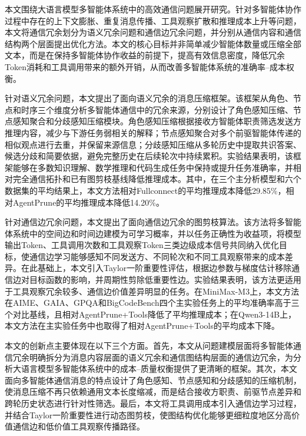 
\begin{conclusion}

本文围绕大语言模型多智能体系统中的高效通信问题展开研究。针对多智能体协作过程中存在的上下文膨胀、重复消息传播、工具观察扩散和推理成本上升等问题，本文将通信冗余划分为语义冗余问题和通信边冗余问题，并分别从通信内容和通信结构两个层面提出优化方法。本文的核心目标并非简单减少智能体数量或压缩全部文本，而是在保持多智能体协作收益的前提下，提高有效信息密度，降低冗余Token消耗和工具调用带来的额外开销，从而改善多智能体系统的准确率--成本权衡。

针对语义冗余问题，本文提出了面向语义冗余的消息压缩框架。该框架从角色、节点和时序三个维度分析多智能体通信中的冗余来源，分别设计了角色感知压缩、节点感知聚合和分歧感知压缩模块。角色感知压缩根据接收方智能体职责筛选发送方推理内容，减少与下游任务弱相关的解释；节点感知聚合对多个前驱智能体传递的相似观点进行去重，并保留来源信息；分歧感知压缩从多轮历史中提取共识答案、候选分歧和简要依据，避免完整历史在后续轮次中持续累积。实验结果表明，该框架能够在多数知识理解、数学推理和代码生成任务中保持或提升任务准确率，并相对完全通信拓扑和已有图剪枝基线降低推理成本。其中，在三个主分析模型和六个数据集的平均结果上，本文方法相对Fullconnect的平均推理成本降低29.85\%，相对AgentPrune的平均推理成本降低14.20\%。

针对通信边冗余问题，本文提出了面向通信边冗余的图剪枝算法。该方法将多智能体系统中的空间边和时间边建模为可学习概率，并以任务正确性为收益项，将模型输出Token、工具调用次数和工具观察Token三类边级成本信号共同纳入优化目标，使通信边学习能够感知不同发送方、不同轮次和不同工具观察带来的成本差异。在此基础上，本文引入Taylor一阶重要性评估，根据边参数与梯度估计移除通信边对目标函数的影响，并周期性剪除低重要性边。实验结果表明，该方法更适用于工具观察冗余较多、通信边价值差异明显的任务。在MiniMax-M3上，本文方法在AIME、GAIA、GPQA和BigCodeBench四个主实验任务上的平均准确率高于三个对比基线，且相对AgentPrune+Tools降低了平均推理成本；在Qwen3-14B上，本文方法在主实验任务中也取得了相对AgentPrune+Tools的平均成本下降。

本文的创新点主要体现在以下三个方面。首先，本文从问题建模层面将多智能体通信冗余明确拆分为消息内容层面的语义冗余和通信图结构层面的通信边冗余，为分析大语言模型多智能体系统中的成本--质量权衡提供了更清晰的框架。其次，本文面向多智能体通信消息的特点设计了角色感知、节点感知和分歧感知的压缩机制，使消息压缩不再只依赖通用文本长度缩减，而是结合接收方职责、前驱节点差异和跨轮历史状态进行针对性筛选。最后，本文将工具调用成本引入通信边学习过程，并结合Taylor一阶重要性进行动态图剪枝，使图结构优化能够更细粒度地区分高价值通信边和低价值工具观察传播路径。


\end{conclusion}
